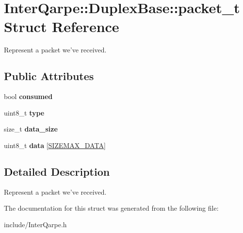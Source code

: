\hypertarget{structInterQarpe_1_1DuplexBase_1_1packet__t}{\section{Inter\+Qarpe\+:\+:Duplex\+Base\+:\+:packet\+\_\+t Struct Reference}
\label{structInterQarpe_1_1DuplexBase_1_1packet__t}
}


Represent a packet we've received.  


\subsection*{Public Attributes}
\begin{DoxyCompactItemize}
\item 
\hypertarget{structInterQarpe_1_1DuplexBase_1_1packet__t_a40475f9cdbe0f70e7439874df7c93d20}{bool {\bfseries consumed}}\label{structInterQarpe_1_1DuplexBase_1_1packet__t_a40475f9cdbe0f70e7439874df7c93d20}

\item 
\hypertarget{structInterQarpe_1_1DuplexBase_1_1packet__t_a9b2ce7764d96b59bc1cc88516a93772d}{uint8\+\_\+t {\bfseries type}}\label{structInterQarpe_1_1DuplexBase_1_1packet__t_a9b2ce7764d96b59bc1cc88516a93772d}

\item 
\hypertarget{structInterQarpe_1_1DuplexBase_1_1packet__t_adc4b335b803f4a0a772554170f49545b}{size\+\_\+t {\bfseries data\+\_\+size}}\label{structInterQarpe_1_1DuplexBase_1_1packet__t_adc4b335b803f4a0a772554170f49545b}

\item 
\hypertarget{structInterQarpe_1_1DuplexBase_1_1packet__t_add4bcece96c329622f3dc72ee9bd6655}{uint8\+\_\+t {\bfseries data} \mbox{[}\hyperlink{classInterQarpe_1_1DuplexBase_a39799251de023bcc865f867728a6cdcc}{S\+I\+Z\+E\+M\+A\+X\+\_\+\+D\+A\+T\+A}\mbox{]}}\label{structInterQarpe_1_1DuplexBase_1_1packet__t_add4bcece96c329622f3dc72ee9bd6655}

\end{DoxyCompactItemize}


\subsection{Detailed Description}
Represent a packet we've received. 

The documentation for this struct was generated from the following file\+:\begin{DoxyCompactItemize}
\item 
include/Inter\+Qarpe.\+h\end{DoxyCompactItemize}
